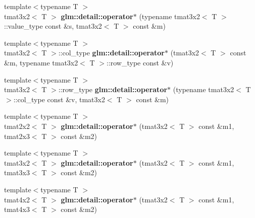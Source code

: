 \begin{DoxyCompactItemize}
\item 
\hypertarget{namespaceglm_1_1detail_a735da0c60596fdb95caaea12de476c81}{{\footnotesize template$<$typename T $>$ }\\tmat3x2$<$ \-T $>$ {\bfseries glm\-::detail\-::operator$\ast$} (typename tmat3x2$<$ \-T $>$\-::value\-\_\-type const \&s, tmat3x2$<$ \-T $>$ const \&m)}\label{namespaceglm_1_1detail_a735da0c60596fdb95caaea12de476c81}

\item 
\hypertarget{namespaceglm_1_1detail_a2b63997a72222b9586de2eef9e403acc}{{\footnotesize template$<$typename T $>$ }\\tmat3x2$<$ \-T $>$\-::col\-\_\-type {\bfseries glm\-::detail\-::operator$\ast$} (tmat3x2$<$ \-T $>$ const \&m, typename tmat3x2$<$ \-T $>$\-::row\-\_\-type const \&v)}\label{namespaceglm_1_1detail_a2b63997a72222b9586de2eef9e403acc}

\item 
\hypertarget{namespaceglm_1_1detail_a97c64346a3814c9c7f4ed475f0d33bb2}{{\footnotesize template$<$typename T $>$ }\\tmat3x2$<$ \-T $>$\-::row\-\_\-type {\bfseries glm\-::detail\-::operator$\ast$} (typename tmat3x2$<$ \-T $>$\-::col\-\_\-type const \&v, tmat3x2$<$ \-T $>$ const \&m)}\label{namespaceglm_1_1detail_a97c64346a3814c9c7f4ed475f0d33bb2}

\item 
\hypertarget{namespaceglm_1_1detail_a42f05ed9bed81669d8b8cbe7be6bfbcb}{{\footnotesize template$<$typename T $>$ }\\tmat2x2$<$ \-T $>$ {\bfseries glm\-::detail\-::operator$\ast$} (tmat3x2$<$ \-T $>$ const \&m1, tmat2x3$<$ \-T $>$ const \&m2)}\label{namespaceglm_1_1detail_a42f05ed9bed81669d8b8cbe7be6bfbcb}

\item 
\hypertarget{namespaceglm_1_1detail_a7af8127fc96fe346c65d0cf4fb4684f6}{{\footnotesize template$<$typename T $>$ }\\tmat3x2$<$ \-T $>$ {\bfseries glm\-::detail\-::operator$\ast$} (tmat3x2$<$ \-T $>$ const \&m1, tmat3x3$<$ \-T $>$ const \&m2)}\label{namespaceglm_1_1detail_a7af8127fc96fe346c65d0cf4fb4684f6}

\item 
\hypertarget{namespaceglm_1_1detail_aa6026ed3ec7317b13084df463fcb5256}{{\footnotesize template$<$typename T $>$ }\\tmat4x2$<$ \-T $>$ {\bfseries glm\-::detail\-::operator$\ast$} (tmat3x2$<$ \-T $>$ const \&m1, tmat4x3$<$ \-T $>$ const \&m2)}\label{namespaceglm_1_1detail_aa6026ed3ec7317b13084df463fcb5256}


\end{DoxyCompactItemize}
